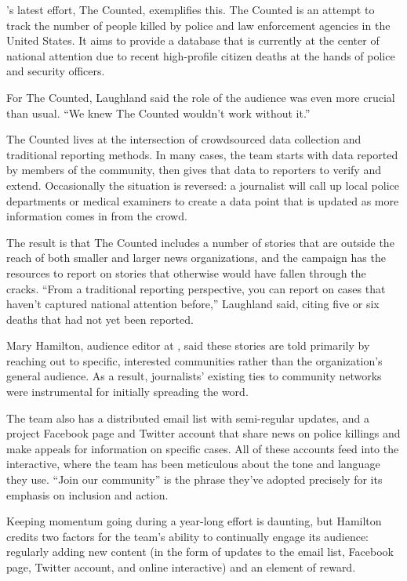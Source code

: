 \begin{itemize}
\begin{itemize}
\begin{enumerate}
{’s latest effort, The Counted, exemplifies this.\autocite{Counted} The Counted is an attempt to track the number of people killed by police and law enforcement agencies in the United States. It aims to provide a database that is currently at the center of national attention due to recent high-profile citizen deaths at the hands of police and security officers.

For The Counted, Laughland said the role of the audience was even more crucial than usual. “We knew The Counted wouldn’t work without it.”\autocite{Laughland}

The Counted lives at the intersection of crowdsourced data collection and traditional reporting methods. In many cases, the team starts with data reported by members of the community, then gives that data to reporters to verify and extend. Occasionally the situation is reversed: a journalist will call up local police departments or medical examiners to create a data point that is updated as more information comes in from the crowd. 

The result is that The Counted includes a number of stories that are outside the reach of both smaller and larger news organizations, and the campaign has the resources to report on stories that otherwise would have fallen through the cracks. “From a traditional reporting perspective, you can report on cases that haven’t captured national attention before,” Laughland said, citing five or six deaths that had not yet been reported. 

Mary Hamilton, audience editor at , said these stories are told primarily by reaching out to specific, interested communities rather than the organization’s general audience.\autocite{Hamilton} As a result, journalists’ existing ties to community networks were instrumental for initially spreading the word.

The team also has a distributed email list with semi-regular updates, and a project Facebook page and Twitter account that share news on police killings and make appeals for information on specific cases. All of these accounts feed into the interactive,\autocite{MPExpense} where the team has been meticulous about the tone and language they use. “Join our community” is the phrase they’ve adopted precisely for its emphasis on inclusion and action. 

Keeping momentum going during a year-long effort is daunting, but Hamilton credits two factors for the team’s ability to continually engage its audience: regularly adding new content (in the form of updates to the email list, Facebook page, Twitter account, and online interactive) and an element of reward. 

}
\end{enumerate}
\end{itemize}
\end{itemize}
